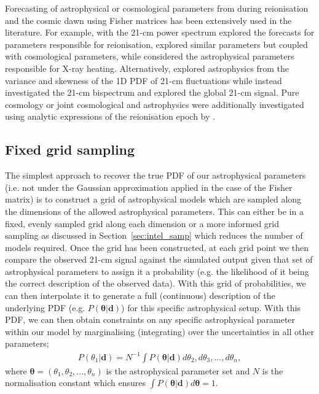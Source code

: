 Forecasting of astrophysical or cosmological parameters from during reionisation and the cosmic dawn using Fisher matrices has been extensively used in the literature. For example, with the 21-cm power spectrum \cite{Pober:2014} explored the forecasts for parameters responsible for reionisation, \cite{Liu:2016b} explored similar parameters but coupled with cosmological parameters, while \cite{Ewall-Wice:2016} considered the astrophysical parameters responsible for X-ray heating. Alternatively, \cite{Kubota:2016} explored astrophysics from the variance and skewness of the 1D PDF of 21-cm fluctuations while \cite{Shimabukuro:2017} instead investigated the 21-cm bispectrum and \cite{Pritchard:2010a} explored the global 21-cm signal. Pure cosmology or joint cosmological and astrophysics were additionally investigated using analytic expressions of the reionisation epoch by \cite{McQuinn:2006,Mao:2008,Barger:2009,Visbal:2009,Liu:2016b}.

\subsection{Fixed grid sampling}

The simplest approach to recover the true PDF of our astrophysical parameters (i.e. not under the Gaussian approximation applied in the case of the Fisher matrix) is to construct a grid of astrophysical models which are sampled along the dimensions of the allowed astrophysical parameters. This can either be in a fixed, evenly sampled grid along each dimension or a more informed grid sampling as discussed in Section~\ref{sec:intel_samp} which reduces the number of models required. Once the grid has been constructed, at each grid point we then compare the observed 21-cm signal against the simulated output given that set of astrophysical parameters to assign it a probability (e.g. the likelihood of it being the correct description of the observed data). With this grid of probabilities, we can then interpolate it to generate a full (continuous) description of the underlying PDF (e.g. $P(\mathbf{\theta}|\mathbf{d})$) for this specific astrophysical setup. With this PDF, we can then obtain constraints on any specific astrophysical parameter within our model by marginalising (integrating) over the uncertainties in all other parameters;
\begin{eqnarray}
P(\theta_{1}|\mathbf{d}) = N^{-1} \int P(\mathbf{\theta}|\mathbf{d}) d\theta_{2},d\theta_{3},...,d\theta_{n},
\end{eqnarray}
where $\mathbf{\theta} = (\theta_{1}, \theta_{2}, ..., \theta_{n})$ is the astrophysical parameter set and $N$ is the normalisation constant which ensures $\int P(\mathbf{\theta}|\mathbf{d}) d\mathbf{\theta} = 1$.

